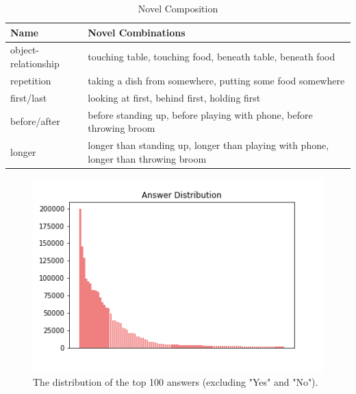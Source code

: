 
\begin{table}[ht]
    \begin{center}
    \caption{Novel Composition}
    \label{novel_composition_table}
    \begin{tabular}{|p{2cm}|p{5cm}|}
    \hline
    \textbf{Name} & \textbf{Novel Combinations} \\
    \hline
    object-relationship & touching table, touching food, beneath table, beneath food\\
    \hline
    repetition & taking a dish from somewhere, putting some food somewhere\\
    \hline
    first/last & looking at first, behind first, holding first \\
    \hline
    before/after & before standing up, before playing with phone, before throwing broom\\
    \hline
    longer & longer than standing up, longer than playing with phone, longer than throwing broom\\
    \hline
    
    \end{tabular}
    
    \end{center}
\end{table}



\newpage

\begin{figure}[t]
\begin{center}
\includegraphics[width=0.8\linewidth]{Figures/answer_dist.png}
\end{center}
   \caption{The distribution of the top 100 answers (excluding "Yes" and "No").}
\label{answer_dist}
\end{figure}


